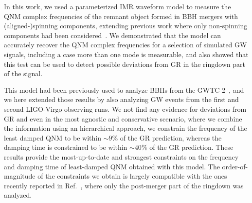 
In this work, we used a parameterized IMR waveform model to measure the QNM complex frequencies of the remnant object formed in BBH mergers with (aligned-)spinning components, extending previous work where only non-spinning components had been considered~\cite{Brito:2018rfr}. We demonstrated that the model can accurately recover the QNM complex frequencies for a selection of simulated GW signals, including a case more than one mode is measurable, and also showed that this test can be used to detect possible deviations from GR in the ringdown part of the signal.

This model had been previously used to analyze BBHs from the GWTC-2~\cite{Abbott:2020jks}, and we here extended those results by also analyzing GW events from the first and second LIGO-Virgo observing runs. We not find any evidence for deviations from GR and even in the most agnostic and conservative scenario, where we combine the information using an hierarchical approach, we constrain the frequency of the least damped QNM to be within $\sim 9\%$ of the GR prediction, whereas the damping time is constrained to be within $\sim 40\%$ of the GR prediction. These results provide the most-up-to-date and strongest constraints on the frequency and damping time of least-damped QNM obtained with this model. The order-of-magnitude of the constraints we obtain is largely compatible with the ones recently reported in Ref.~\cite{Carullo:2021dui}, where only the post-merger part of the ringdown was analyzed.

